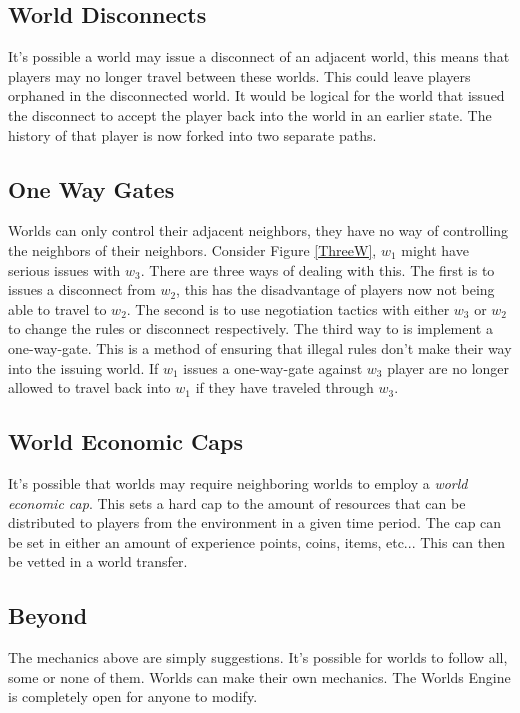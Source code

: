 \documentclass[runningheads,a4paper]{llncs}
\begin{document}
\subsection{World Disconnects}
\label{WD}
It's possible a world may issue a disconnect of an adjacent world, this means that players may no longer travel between these worlds. This could leave players orphaned in the disconnected world. It would be logical for the world that issued the disconnect to accept the player back into the world in an earlier state. The history of that player is now forked into two separate paths.

\subsection{One Way Gates}
Worlds can only control their adjacent neighbors, they have no way of controlling the neighbors of their neighbors. Consider Figure \ref{ThreeW}, $w_1$ might have serious issues with $w_3$. There are three ways of dealing with this. The first is to issues a disconnect from $w_2$, this has the disadvantage of players now not being able to travel to $w_2$. The second is to use negotiation tactics with either $w_3$ or $w_2$ to change the rules or disconnect respectively. The third way to is implement a one-way-gate. This is a method of ensuring that illegal rules don't make their way into the issuing world. If $w_1$ issues a one-way-gate against $w_3$ player are no longer allowed to travel back into $w_1$ if they have traveled through $w_3$.

\subsection{World Economic Caps}
It's possible that worlds may require neighboring worlds to employ a \textit{world economic cap}. This sets a hard cap to the amount of resources that can be distributed to players from the environment in a given time period. The cap can be set in either an amount of experience points, coins, items, etc... This can then be vetted in a world transfer.  

\subsection{Beyond}
The mechanics above are simply suggestions. It's possible for worlds to follow all, some or none of them. Worlds can make their own mechanics. The Worlds Engine is completely open for anyone to modify.
\end{document}

